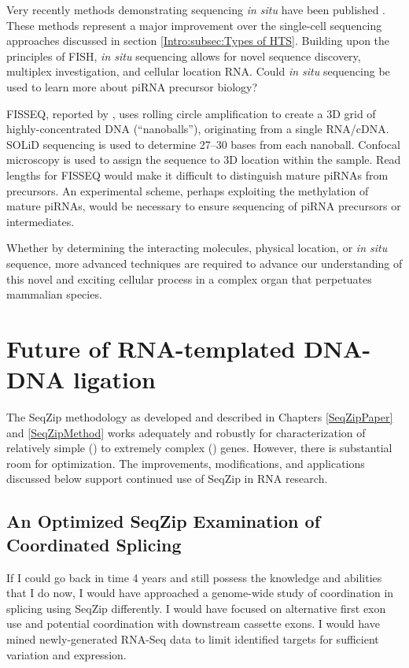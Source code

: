     Very recently methods demonstrating sequencing \textit{in situ} have been published \citep{Ke2013,Lee2014a}. These methods represent a major improvement over the single-cell sequencing approaches discussed in section \ref{Intro:subsec:Types of HTS}. Building upon the principles of FISH, \textit{in situ} sequencing allows for novel sequence discovery, multiplex investigation, and cellular location RNA. Could \textit{in situ} sequencing be used to learn more about piRNA precursor biology?

    FISSEQ, reported by \citet{Lee2014a}, uses rolling circle amplification to create a 3D grid of highly-concentrated DNA (``nanoballs''), originating from a single RNA/cDNA. SOLiD sequencing is used to determine 27--30 bases from each nanoball. Confocal microscopy is used to assign the sequence to 3D location within the sample. Read lengths for FISSEQ would make it difficult to distinguish mature piRNAs from precursors. An experimental scheme, perhaps exploiting the methylation of mature piRNAs, would be necessary to ensure sequencing of piRNA precursors or intermediates.

    Whether by determining the interacting molecules, physical location, or \textit{in situ} sequence, more advanced techniques are required to advance our understanding of this novel and exciting cellular process in a complex organ that perpetuates mammalian species.

\section{Future of RNA-templated DNA-DNA ligation}
  \label{Disc:sec:SeqZip Improvements}

  The SeqZip methodology as developed and described in Chapters \ref{SeqZipPaper} and \ref{SeqZipMethod} works adequately and robustly for characterization of relatively simple (\cd{}) to extremely complex (\dscam{}) genes. However, there is substantial room for optimization. The improvements, modifications, and applications discussed below support continued use of SeqZip in RNA research.

  \subsection{An Optimized SeqZip Examination of Coordinated Splicing}
    \label{Disc:subsec: Ideal SeqZip exp. to look for Coordination}

    If I could go back in time 4 years and still possess the knowledge and abilities that I do now, I would have approached a genome-wide study of coordination in splicing using SeqZip differently. I would have focused on alternative first exon use and potential coordination with downstream cassette exons. I would have mined newly-generated RNA-Seq data \citep{Wang2008, Pan2008} to limit identified targets for sufficient variation and expression. 

